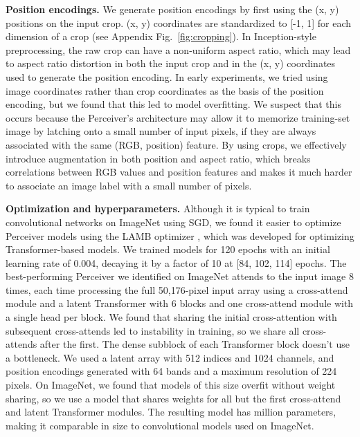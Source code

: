 \documentclass{article}
\begin{document}
\noindent \textbf{Position encodings.} We generate position encodings by first using the (x, y) positions on the  input crop. (x, y) coordinates are standardized to [-1, 1] for each dimension of a crop (see Appendix Fig.~\ref{fig:cropping}). In Inception-style preprocessing, the raw crop can have a non-uniform aspect ratio, which may lead to aspect ratio distortion in both the input crop and in the (x, y) coordinates used to generate the position encoding. In early experiments, we tried using image coordinates rather than crop coordinates as the basis of the position encoding, but we found that this led to model overfitting. We suspect that this occurs because the Perceiver's architecture may allow it to memorize training-set image by latching onto a small number of input pixels, if they are always associated with the same (RGB, position) feature. By using crops, we effectively introduce augmentation in both position and aspect ratio, which breaks correlations between RGB values and position features and makes it much harder to associate an image label with a small number of pixels.

\noindent \textbf{Optimization and hyperparameters.} Although it is typical to train convolutional networks on ImageNet using SGD, we found it easier to optimize Perceiver models using the LAMB optimizer \cite{you2020large}, which was developed for optimizing Transformer-based models. We trained models for 120 epochs with an initial learning rate of 0.004, decaying it by a factor of 10 at [84, 102, 114] epochs. The best-performing Perceiver we identified on ImageNet attends to the input image 8 times, each time processing the full 50,176-pixel input array using a cross-attend module and a latent Transformer with 6 blocks and one cross-attend module with a single head per block. We found that sharing the initial cross-attention with subsequent cross-attends led to instability in training, so we share all cross-attends after the first.  The dense subblock of each Transformer block doesn't use a bottleneck. We used a latent array with 512 indices and 1024 channels, and position encodings generated with 64 bands and a maximum resolution of 224 pixels. On ImageNet, we found that models of this size overfit without weight sharing, so we use a model that shares weights for all but the first cross-attend and latent Transformer modules. The resulting model has  million parameters, making it comparable in size to convolutional models used on ImageNet.
\end{document}
